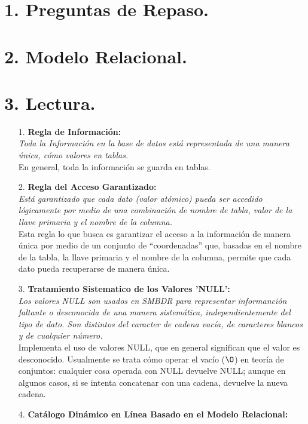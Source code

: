 \documentclass[a4paper, 12pt]{report}
\begin{document}
\section*{1. Preguntas de Repaso.}{
}

\section*{2. Modelo Relacional.}{
}

\section*{3. Lectura.}{
\begin{enumerate}
\item[1.]{\textbf{Regla de Información: } \\
    \textit{Toda la Información en la base de datos está representada de una
    manera única, cómo valores en tablas.}\\
    En general, toda la información se guarda en tablas.
}
\item[2.]{\textbf{Regla del Acceso Garantizado: }\\
    \textit{Está garantizado que cada dato (valor atómico) pueda ser accedido
    lógicamente por medio de una combinación de nombre de tabla, valor de la
    llave primaria y el nombre de la columna.}\\
    Esta regla lo que busca es garantizar el acceso a la información de manera
    única por medio de un conjunto de ``coordenadas'' que, basadas en el nombre
    de la tabla, la llave primaria y el nombre de la columna, permite que cada
    dato pueda recuperarse de manera única.
}
\item[3.]{\textbf{Tratamiento Sistematico de los Valores 'NULL': }\\\textit{
    Los valores NULL son usados en SMBDR para representar informanción faltante
    o desconocida de una manera sistemática, independientemente del tipo de dato.
    Son distintos del caracter de cadena vacía, de caracteres blancos y de
    cualquier número.}\\
    Implementa el uso de valores NULL, que en general significan que el valor
    es desconocido. Usualmente se trata cómo operar el vacío ($\O$) en teoría de
    conjuntos: cualquier cosa operada con NULL devuelve NULL; aunque en algunos
    casos, si se intenta concatenar con una cadena, devuelve la nueva cadena.
}
\item[4.]{\textbf{Catálogo Dinámico en Línea Basado en el Modelo Relacional:}\\
}
\end{enumerate}}
\end{document}
